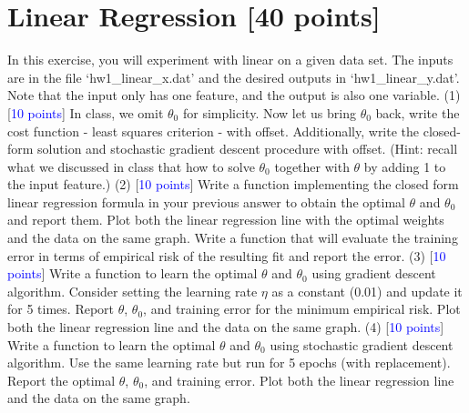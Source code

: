 \documentclass[11pt]{article}
\begin{document}
\section{Linear Regression [40 points]}
In this exercise, you will experiment with linear on a given data set. The inputs are in the file `hw1\_linear\_x.dat' and the desired outputs in `hw1\_linear\_y.dat'. Note that the input only has one feature, and the output is also one variable. 
\newline
\noindent (1) [\textcolor{blue}{10 points}] In class, we omit $\theta_0$ for simplicity. Now let us bring $\theta_0$ back, write the cost function - least squares criterion - with offset. Additionally, write the closed-form solution and stochastic gradient descent procedure with offset. (Hint: recall what we discussed in class that how to solve  $\theta_0$ together with $\theta$  by adding 1 to the input feature.)
\newline
\noindent (2) [\textcolor{blue}{10 points}] Write a function implementing the closed form linear regression formula in your previous answer to obtain the optimal $\theta$ and  $\theta_0$ and report them. Plot both the linear regression line with the optimal weights and the data on the same graph. Write a function that will evaluate the training error in terms of empirical risk of the resulting fit and report the error.
\newline
\noindent (3) [\textcolor{blue}{10 points}] Write a function to learn the optimal $\theta$ and  $\theta_0$ using gradient descent algorithm. Consider setting the learning rate $\eta$ as a constant (0.01) and update it for 5 times. Report $\theta$, $\theta_0$, and training error for the minimum empirical risk. Plot both the linear regression line and the data on the same graph. 
\newline
\noindent (4) [\textcolor{blue}{10 points}] Write a function to learn the optimal $\theta$ and  $\theta_0$ using stochastic gradient descent algorithm. Use the same learning rate but run for 5 epochs (with replacement). Report the optimal $\theta$, $\theta_0$, and training error. Plot both the linear regression line and the data on the same graph.
\end{document}
